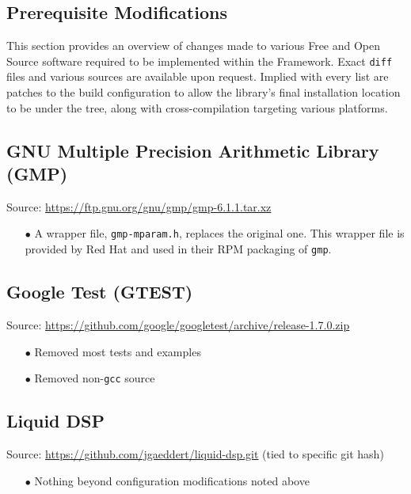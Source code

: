 \newpage
\begin{appendices}
\appendix
\section{Prerequisite Modifications}
This section provides an overview of changes made to various Free and Open Source software required to be implemented within the Framework. Exact \texttt{diff} files and various sources are available upon request. Implied with every list are patches to the build configuration to allow the library's final installation location to be under the  tree, along with cross-compilation targeting various platforms.

\subsection{GNU Multiple Precision Arithmetic Library (GMP)}
\label{App:gmp}
Source: \url{https://ftp.gnu.org/gnu/gmp/gmp-6.1.1.tar.xz}
\begin{enumerate}
\item[$\bullet$] A wrapper file, \verb+gmp-mparam.h+, replaces the original one. This wrapper file is provided by Red Hat and used in their RPM packaging of \texttt{gmp}.
\end{enumerate}

\subsection{Google Test (GTEST)}
\label{App:gtest}
Source: \url{https://github.com/google/googletest/archive/release-1.7.0.zip}
\begin{enumerate}
\item[$\bullet$] Removed most tests and examples
\item[$\bullet$] Removed non-\texttt{gcc} source
\end{enumerate}

\subsection{Liquid DSP}
Source: \url{https://github.com/jgaeddert/liquid-dsp.git} (tied to specific git hash)
\label{App:liquid}
\begin{enumerate}
\item[$\bullet$] Nothing beyond configuration modifications noted above
\end{enumerate}


\end{appendices}
